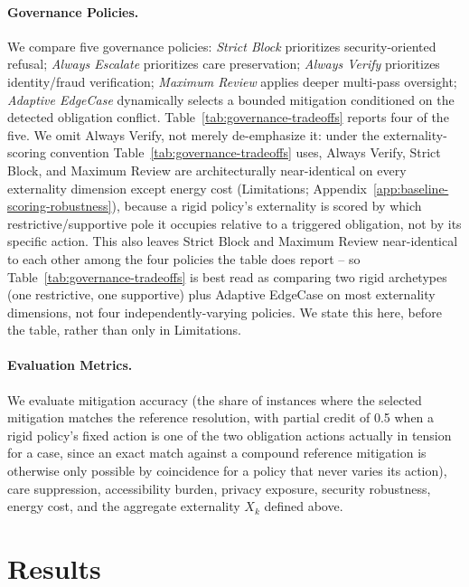 \documentclass[letterpaper]{article} %
\begin{document}
\paragraph{Governance Policies.} We compare five governance policies: \emph{Strict Block} prioritizes security-oriented refusal; \emph{Always Escalate} prioritizes care preservation; \emph{Always Verify} prioritizes identity/fraud verification; \emph{Maximum Review} applies deeper multi-pass oversight; \emph{Adaptive EdgeCase} dynamically selects a bounded mitigation conditioned on the detected obligation conflict. Table~\ref{tab:governance-tradeoffs} reports four of the five. We omit Always Verify, not merely de-emphasize it: under the externality-scoring convention Table~\ref{tab:governance-tradeoffs} uses, Always Verify, Strict Block, and Maximum Review are architecturally near-identical on every externality dimension except energy cost (Limitations; Appendix~\ref{app:baseline-scoring-robustness}), because a rigid policy's externality is scored by which restrictive/supportive pole it occupies relative to a triggered obligation, not by its specific action. This also leaves Strict Block and Maximum Review near-identical to each other among the four policies the table does report -- so Table~\ref{tab:governance-tradeoffs} is best read as comparing two rigid archetypes (one restrictive, one supportive) plus Adaptive EdgeCase on most externality dimensions, not four independently-varying policies. We state this here, before the table, rather than only in Limitations.

\paragraph{Evaluation Metrics.} We evaluate mitigation accuracy (the share of instances where the selected mitigation matches the reference resolution, with partial credit of 0.5 when a rigid policy's fixed action is one of the two obligation actions actually in tension for a case, since an exact match against a compound reference mitigation is otherwise only possible by coincidence for a policy that never varies its action), care suppression, accessibility burden, privacy exposure, security robustness, energy cost, and the aggregate externality $X_k$ defined above.

\section{Results}
\label{sec:results}
\end{document}
